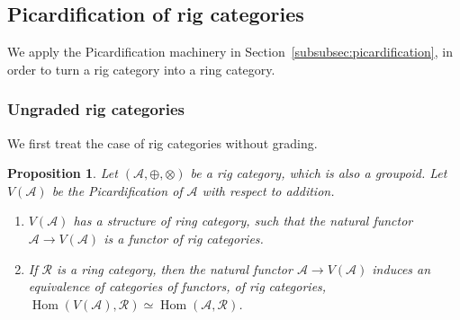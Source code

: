 \documentclass[11pt]{article}
\theoremstyle{plain}
\newtheorem{proposition}[theorem]{Proposition}
\theoremstyle{definition}
\newcommand{\Acal}{\mathcal A}
\newcommand{\Rcal}{\mathcal R}
\DeclareMathOperator{\Hom}{Hom}
\begin{document}
\subsection{Picardification of rig categories}
We apply the Picardification machinery in Section~\ref{subsubsec:picardification}, in order to turn a rig category into a ring category.
\subsubsection{Ungraded rig categories}
We first treat the case of rig categories without grading.
\begin{proposition}\label{prop:rig-to-ring-1}
Let $(\Acal,\oplus,\otimes)$ be a rig category, which is also a groupoid. Let $V(\Acal)$ be the Picardification of $\Acal$ with respect to addition.
\begin{enumerate}
\item $V(\Acal)$ has a structure of ring category, such that the natural functor $\Acal\to V(\Acal)$ is a functor of rig categories.
\item If $\Rcal$ is a ring category, then the natural functor $\Acal\to V(\Acal)$ induces an equivalence of categories of functors, of rig categories, $\Hom(V(\Acal),\Rcal)\simeq\Hom (\Acal,\Rcal)$.
\end{enumerate}
\end{proposition}
\end{document}
